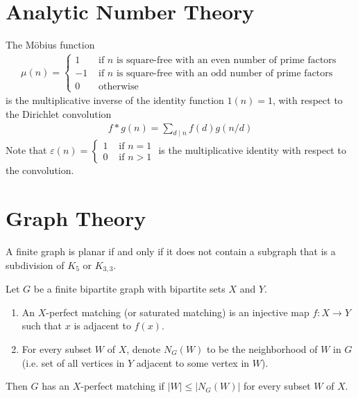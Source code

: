 \documentclass{treatise}
\begin{document}
\begin{shaded}

\chapter{Analytic Number Theory}
\begin{theorem}
The Möbius function
\begin{align*}
\mu(n) = \begin{cases}
1 & \mbox{ if } n \mbox{ is square-free with an even number of prime factors}
\\
-1 & \mbox{ if } n \mbox{ is square-free with an odd number of prime factors}
\\
0 & \mbox{ otherwise}
\end{cases}
\end{align*}
is the multiplicative inverse of the identity function $1(n) = 1$, with respect to the Dirichlet convolution
\begin{align*}
	f * g (n) = \sum_{d \mid n} f(d) g(n/d)
\end{align*}
Note that $\varepsilon(n) = \begin{cases}
1 & \mbox{ if } n = 1 \\
0 & \mbox{ if } n > 1
\end{cases}$ is the multiplicative identity with respect to the convolution.
\end{theorem}

\chapter{Graph Theory}
\begin{theorem}
A finite graph is planar if and only if it does not contain a subgraph that is a subdivision of $K_5$ or $K_{3, 3}$.
\end{theorem}
\begin{theorem}
Let $G$ be a finite bipartite graph with bipartite sets $X$ and $Y$.
\begin{enumerate}
	\item An $X$-perfect matching (or saturated matching) is an injective map $f: X \to Y$ such that $x$ is adjacent to $f(x)$.
	\item For every subset $W$ of $X$, denote $N_G(W)$ to be the neighborhood of $W$ in $G$ (i.e. set of all vertices in $Y$ adjacent to some vertex in $W$).
\end{enumerate}
Then $G$ has an $X$-perfect matching if $|W| \leq |N_G(W)|$ for every subset $W$ of $X$.
\end{theorem}
\begin{theorem}
\end{theorem}
\begin{theorem}
\end{theorem}
\begin{theorem}
\end{theorem}


\end{shaded}
\end{document}
